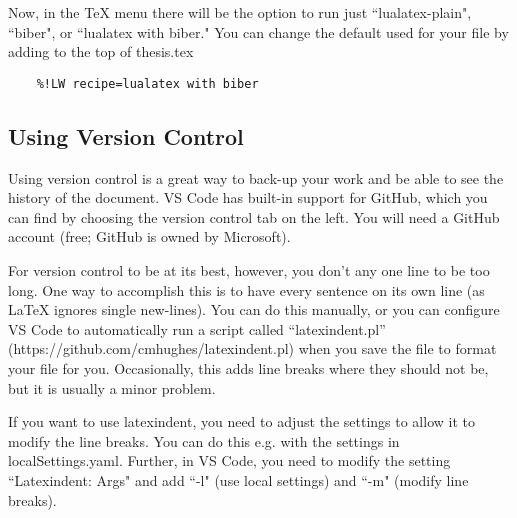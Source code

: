 \documentclass{article}
\begin{document}
Now, in the TeX menu there will be the option to run just ``lualatex-plain", ``biber", or ``lualatex with biber."
You can change the default used for your file by adding to the top of thesis.tex
\begin{verbatim}
    %!LW recipe=lualatex with biber
\end{verbatim}

\subsection{Using Version Control}
Using version control is a great way to back-up your work and be able to see the history of the document.
VS Code has built-in support for GitHub, which you can find by choosing the version control tab on the left.
You will need a GitHub account (free; GitHub is owned by Microsoft).

For version control to be at its best, however, you don't any one line to be too long.
One way to accomplish this is to have every sentence on its own line (as LaTeX ignores single new-lines).
You can do this manually, or you can configure VS Code to automatically run a script called ``latexindent.pl'' (https://github.com/cmhughes/latexindent.pl) when you save the file to format your file for you. Occasionally, this adds line breaks where they should not be, but it is usually a minor problem.

If you want to use latexindent, you need to adjust the settings to allow it to modify the line breaks. You can do this e.g. with the settings in localSettings.yaml. Further, in VS Code, you need to modify the setting ``Latexindent: Args" and add ``-l" (use local settings) and ``-m" (modify line breaks).
\end{document}
